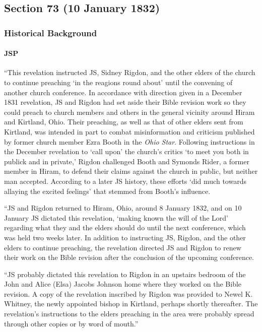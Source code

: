 \subsection{Section 73 (10 January 1832)}
	\label{DC73}
	
	\subsubsection{Historical Background}
		\label{DC73-HB}
		
		\paragraph{JSP}
		
			``This revelation instructed JS, Sidney Rigdon, and the other elders of the church to continue preaching `in the reagions round about' until the convening of another church conference. In accordance with direction given in a December 1831 revelation, JS and Rigdon had set aside their Bible revision work so they could preach to church members and others in the general vicinity around Hiram and Kirtland, Ohio. Their preaching, as well as that of other elders sent from Kirtland, was intended in part to combat misinformation and criticism published by former church member Ezra Booth in the \textit{Ohio Star}. Following instructions in the December revelation to `call upon' the church's critics `to meet you both in publick and in private,' Rigdon challenged Booth and Symonds Rider, a former member in Hiram, to defend their claims against the church in public, but neither man accepted. According to a later JS history, these efforts `did much towards allaying the excited feelings' that stemmed from Booth's influence.
			
			``JS and Rigdon returned to Hiram, Ohio, around 8 January 1832, and on 10 January JS dictated this revelation, `making known the will of the Lord' regarding what they and the elders should do until the next conference, which was held two weeks later. In addition to instructing JS, Rigdon, and the other elders to continue preaching, the revelation directed JS and Rigdon to renew their work on the Bible revision after the conclusion of the upcoming conference.
			
			``JS probably dictated this revelation to Rigdon in an upstairs bedroom of the John and Alice (Elsa) Jacobs Johnson home where they worked on the Bible revision. A copy of the revelation inscribed by Rigdon was provided to Newel K. Whitney, the newly appointed bishop in Kirtland, perhaps shortly thereafter. The revelation's instructions to the elders preaching in the area were probably spread through other copies or by word of mouth.''
		
